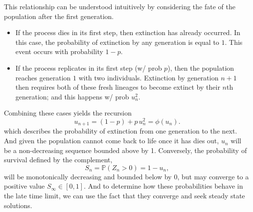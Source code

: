\documentclass[11pt,a4paper]{article}
\theoremstyle{plain}
\theoremstyle{definition}
\begin{document}
This relationship can be understood intuitively by considering the fate of the
population after the first generation.

\begin{itemize}
    \item If the process dies in its first step, then extinction has already
    occurred. In this case, the probability of extinction by any generation is
    equal to $1$. This event occurs with probability $1-p$.
    \item If the process replicates in its first step (w/ prob $p$), then the population
    reaches generation $1$ with two individuals. Extinction by generation $n+1$
    then requires both of these fresh lineages to become extinct by their $n$th generation; and this happens w/ prob $u_n^2$.
\end{itemize}

\noindent
Combining these cases yields the recursion
\[
u_{n+1} = (1-p) + p\, u_n^2 = \phi(u_n).
\]
which describes the probability of extinction from one generation to the next. And given the population cannot come 
back to life once it has dies out, $u_n$ will be a non-decreasing sequence bounded above by 1. Conversely, the probability of survival
defined by the complement, $$ S_n = \mathbb{P}(Z_n > 0)  = 1-u_n,$$ will be monotonically decreasing and bounded below by 0, but may converge to a positive value $S_\infty \in [0,1]$.
And to determine how these probabilities behave in the late time limit, we can use the fact that they converge and seek steady state solutions.
\end{document}
